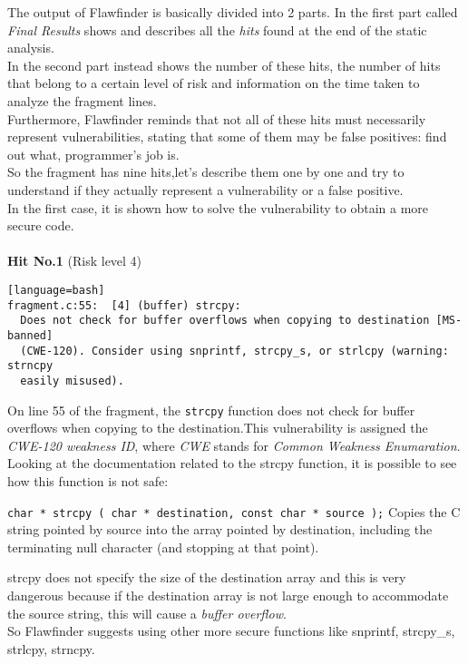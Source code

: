 \documentclass[a4paper,12pt]{article}
\newenvironment{SpecialPar}
  {\begin{shaded}}
  {\end{shaded}}
\begin{document}
The output of Flawfinder is basically divided into 2 parts.
In the first part called \textit{Final Results} shows and describes all the \textit{hits} found at the end of the static analysis.\\
In the second part instead shows the number of these hits, the number of hits that belong to a certain level of risk and information on the time taken to analyze the fragment lines.\\
Furthermore, Flawfinder reminds that not all of these hits must necessarily represent vulnerabilities, stating that some of them may be false positives: find out what, programmer's job is.\\
So the fragment has nine hits,let's describe them one by one and try to understand if they actually represent a vulnerability or a false positive.\\
In the first case, it is shown how to solve the vulnerability to obtain a more secure code.\\
\\
\textbf{Hit No.1} (Risk level 4)
\begin{lstlisting}[style=DOS][language=bash]
fragment.c:55:  [4] (buffer) strcpy:
  Does not check for buffer overflows when copying to destination [MS-banned]
  (CWE-120). Consider using snprintf, strcpy_s, or strlcpy (warning: strncpy
  easily misused).
\end{lstlisting}
On line 55 of the fragment, the \texttt{strcpy} function does not check for buffer overflows when copying to the destination.This vulnerability is assigned the \textit{CWE-120 weakness ID}, where \textit{CWE} stands for \textit{Common Weakness Enumaration}\cite{CWE}.\\
Looking at the documentation related to the strcpy function\cite{strcpy}, it is possible to see how this function is not safe:\\
\begin{SpecialPar}
\noindent
\texttt{char * strcpy ( char * destination, const char * source );}
Copies the C string pointed by source into the array 		pointed by destination, including the terminating null character (and stopping at that point).
\end{SpecialPar}
\noindent
strcpy does not specify the size of the destination array and this is very dangerous because if the destination array is not large enough to accommodate the source string, this will cause a \textit{buffer overflow}.\\
So Flawfinder suggests using other more secure functions like snprintf, strcpy\_s, strlcpy, strncpy.
\end{document}
